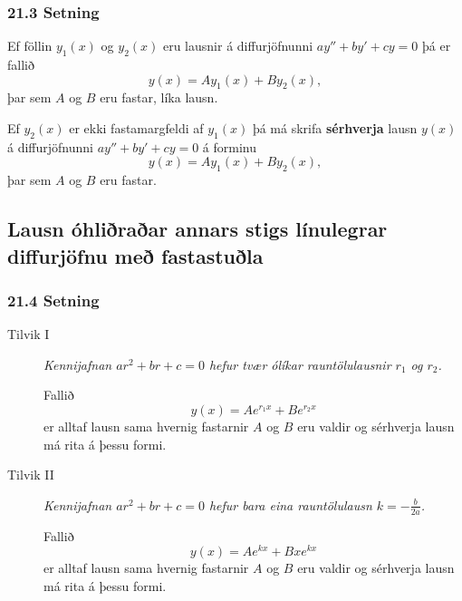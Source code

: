  \subsubsection{21.3 Setning}  Ef föllin $y_1(x)$ og $y_2(x)$ eru lausnir á
diffurjöfnunni $ay''+by'+cy=0$ þá er fallið
$$y(x)=Ay_1(x)+By_2(x),$$  
þar sem $A$ og $B$ eru fastar, líka lausn. 

\pause

Ef $y_2(x)$ er ekki
fastamargfeldi af $y_1(x)$ þá má skrifa \textbf{sérhverja} lausn $y(x)$ á
diffurjöfnunni $ay''+by'+cy=0$ á forminu
$$y(x)=Ay_1(x)+By_2(x),$$  
þar sem $A$ og $B$ eru fastar.
 


\subsection[t]{Lausn óhliðraðar annars stigs línulegrar diffurjöfnu með
  fastastuðla}
 \subsubsection{21.4 Setning}
\begin{description}
\item[Tilvik I] \emph{Kennijafnan $ar^2+br+c=0$ hefur tvær ólíkar rauntölulausnir
  $r_1$ og $r_2$.}

\pause
Fallið
$$y(x)=Ae^{r_1x}+Be^{r_2x}$$
er alltaf lausn sama hvernig fastarnir $A$ og $B$ eru valdir og
sérhverja lausn má rita á þessu formi.

\pause

\item[Tilvik II] \emph{Kennijafnan $ar^2+br+c=0$ hefur bara eina rauntölulausn
  $k=-\frac{b}{2a}$.}

\pause

Fallið
$$y(x)=Ae^{kx}+Bxe^{kx}$$
er alltaf lausn sama hvernig fastarnir $A$ og $B$ eru valdir og
sérhverja lausn má rita á þessu formi.
\end{description}
 


\subsection[t]{
}
